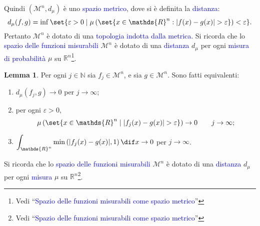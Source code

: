 \documentclass[10pt]{book}
\newcommand{\1}{\mathds{1}}
\newcommand{\R}{\mathds{R}}
\newcommand{\N}{\mathds{N}}
\theoremstyle{definition}%
\newtheorem{lem}[thm]{Lemma}
\theoremstyle{plain}
\theoremstyle{remark}
\renewcommand{\href}[2]{\textcolor{blue}{#2}}
\begin{document}
Quindi \((\mathcal{M}^{n},d_{\mu})\) è uno \href{../../../../../org/roam/20250301193511-spazio_metrico.org}{spazio metrico}, dove si è definita la \href{../../../../../org/roam/20250301193511-spazio_metrico.org}{distanza}:
\begin{equation*}
d_{\mu}(f,g) = \inf\set{\varepsilon>0\mid \mu\left(\set{x \in \R^{n}: |f(x)-g(x)|>\varepsilon}\right)<\varepsilon}.
\end{equation*}
Pertanto \(\mathcal{M}^{n}\) è dotato di una \href{../../../../../org/roam/20250103145124-topologia.org}{topologia} \href{../../../../../org/roam/20250301193530-topologia_indotta_da_una_distanza.org}{indotta dalla metrica}.
Si ricorda che lo \href{../../../../../org/roam/20250704104947-funzione_misurabile.org}{spazio delle funzioni misurabili} \(\mathcal{M}^{n}\) è dotato di una \href{../../../../../org/roam/20250301193511-spazio_metrico.org}{distanza} \(d_{\mu}\) per ogni \href{../../../../../org/roam/20250704163455-misura.org}{misura} \href{../../../../../org/roam/20250704105515-misura_di_probabilita.org}{di probabilità} \(\mu\) su \(\R^{n}\)\footnote{Vedi ``\href{../../../../../org/roam/20250704104537-spazio_delle_funzioni_misurabili_come_spazio_metrico.org}{Spazio delle funzioni misurabili come spazio metrico}''}.

\begin{lem}
Per ogni \(j \in \N\) sia \(f_{j} \in \mathcal{M}^{n}\), e sia \(g \in \mathcal{M}^{n}\). Sono fatti equivalenti:
\begin{enumerate}
\item \(d_{\mu}(f_{j},g)\to 0\) per \(j\to\infty\);
\item per ogni \(\varepsilon>0\),
\begin{equation*}
 \mu\left(
 	\set{x \in \R^{n}\mid |f_{j}(x)-g(x)|>\varepsilon}
 \right)\to 0\qquad j\to \infty;
\end{equation*}
\item \(\displaystyle \int_{\R^{n}} \min\left(|f_{j}(x)-g(x)|, 1\right) \dif x \to 0\) per \(j\to\infty\).
\end{enumerate}
\label{lem9.3.20}
\end{lem}
Si ricorda che lo \href{../../../../../org/roam/20250704104947-funzione_misurabile.org}{spazio delle funzioni misurabili} \(\mathcal{M}^{n}\) è dotato di una \href{../../../../../org/roam/20250301193511-spazio_metrico.org}{distanza} \(d_{\mu}\) per ogni \href{../../../../../org/roam/20250704163455-misura.org}{misura} \(\mu\) su \(\R^{n}\)\footnote{Vedi ``\href{../../../../../org/roam/20250704104537-spazio_delle_funzioni_misurabili_come_spazio_metrico.org}{Spazio delle funzioni misurabili come spazio metrico}''}.
\end{document}
